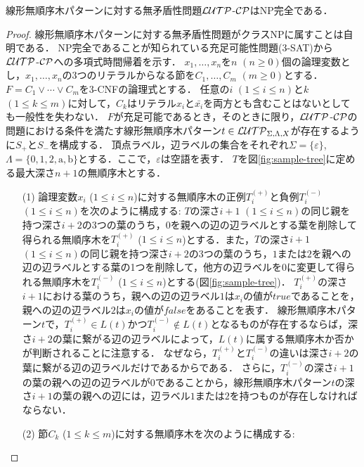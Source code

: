 \begin{theorem}
線形無順序木パターンに対する無矛盾性問題${\cal LUTP}$-${\cal CP}$はNP完全である．
\end{theorem}

\begin{proof}
線形無順序木パターンに対する無矛盾性問題がクラスNPに属すことは自明である．
NP完全であることが知られている充足可能性問題(3-SAT)から${\cal LUTP}$-${\cal CP}$への多項式時間帰着を示す．
$x_{1},\ldots,x_{n}$を$n$ $(n\geq 0)$個の論理変数とし，$x_{1},\ldots,x_{n}$の3つのリテラルからなる節を$C_{1},\ldots,C_{m}$ $(m\geq 0)$とする．
$F=C_{1}\vee\cdots\vee C_{m}$を3-CNFの論理式とする．
任意の$i$ $(1\leq i\leq n)$と$k$ $(1\leq k\leq m)$に対して，$C_{k}$はリテラル$x_i$と$\bar{x_i}$を両方とも含むことはないとしても一般性を失わない．
$F$が充足可能であるとき，そのときに限り，${\cal LUTP}$-${\cal CP}$の問題における条件を満たす線形無順序木パターン$t\in {\cal LUTP}_{\Sigma,\Lambda,X}$が存在するように$S_{+}$と$S_{-}$を構成する．
頂点ラベル，辺ラベルの集合をそれぞれ$\Sigma=\{\varepsilon\}$, $\Lambda=\{0,1,2,\textrm{a},\textrm{b}\}$とする．ここで，$\varepsilon$は空語を表す．
$T$を図\ref{fig:sample-tree}に定める最大深さ$n+1$の無順序木とする．
\begin{enumerate}
\item[(1)] 論理変数$x_{i}$ ($1\leq i\leq n$)に対する無順序木の正例$T_{i}^{(+)}$と負例$T_{i}^{(-)}$ $(1\leq i\leq n)$を次のように構成する:
$T$の深さ$i+1$ $(1\leq i\leq n)$の同じ親を持つ深さ$i+2$の3つの葉のうち，$0$を親への辺の辺ラベルとする葉を削除して得られる無順序木を$T_{i}^{(+)}$ ($1\leq i\leq n$)とする．また，$T$の深さ$i+1$ $(1\leq i\leq n)$の同じ親を持つ深さ$i+2$の3つの葉のうち，$1$または$2$を親への辺の辺ラベルとする葉の1つを削除して，他方の辺ラベルを$0$に変更して得られる無順序木を$T_{i}^{(-)}$ ($1\leq i\leq n$)とする(図\ref{fig:sample-tree})．
$T_{i}^{(+)}$の深さ$i+1$における葉のうち，親への辺の辺ラベル$1$は$x_{i}$の値が$true$であることを，親への辺の辺ラベル$2$は$x_{i}$の値が$false$をあることを表す．
線形無順序木パターン$t$で，$T_{i}^{(+)}\in L(t)$かつ$T_{i}^{(-)}\not\in L(t)$となるものが存在するならば，深さ$i+2$の葉に繋がる辺の辺ラベルによって，$L(t)$に属する無順序木か否かが判断されることに注意する．
なぜなら，$T_{i}^{(+)}$と$T_{i}^{(-)}$の違いは深さ$i+2$の葉に繋がる辺の辺ラベルだけであるからである．
さらに，$T_{i}^{(-)}$の深さ$i+1$の葉の親への辺の辺ラベルが$0$であることから，線形無順序木パターン$t$の深さ$i+1$の葉の親への辺には，辺ラベル$1$または$2$を持つものが存在しなければならない．
\item[(2)] 節$C_{k}$ ($1\leq k\leq m$)に対する無順序木を次のように構成する:

\end{enumerate}
\end{proof}
